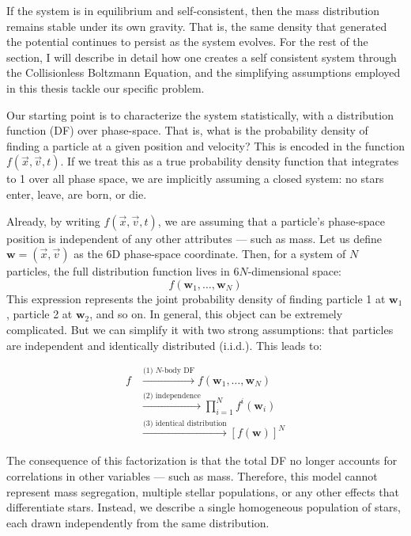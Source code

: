         If the system is in equilibrium and self-consistent, then the mass distribution remains stable under its own gravity. That is, the same density that generated the potential continues to persist as the system evolves. For the rest of the section, I will describe in detail how one creates a self consistent system through the Collisionless Boltzmann Equation, and the simplifying assumptions employed in this thesis tackle our specific problem.

        Our starting point is to characterize the system statistically, with a distribution function (DF) over phase-space. That is, what is the probability density of finding a particle at a given position and velocity? This is encoded in the function \( f(\vec{x}, \vec{v}, t) \). If we treat this as a true probability density function that integrates to 1 over all phase space, we are implicitly assuming a closed system: no stars enter, leave, are born, or die.

        Already, by writing \( f(\vec{x}, \vec{v}, t) \), we are assuming that a particle's phase-space position is independent of any other attributes — such as mass. Let us define \( \mathbf{w} = (\vec{x}, \vec{v}) \) as the 6D phase-space coordinate. Then, for a system of \( N \) particles, the full distribution function lives in \(6N\)-dimensional space:  
        \[
        f(\mathbf{w}_1, \dots, \mathbf{w}_N)
        \]  
        This expression represents the joint probability density of finding particle 1 at \( \mathbf{w}_1 \), particle 2 at \( \mathbf{w}_2 \), and so on. In general, this object can be extremely complicated. But we can simplify it with two strong assumptions: that particles are independent and identically distributed (i.i.d.). This leads to:

        \[
        \begin{array}{rl}
        f 
        & \stackrel{\text{(1) $N$-body DF}}{\longrightarrow} 
        f(\mathbf{w}_1, \dots, \mathbf{w}_N) \\[2ex]
        & \stackrel{\text{(2) independence}}{\longrightarrow} 
        \prod_{i=1}^N f^i(\mathbf{w}_i) \\[2ex]
        & \stackrel{\text{(3) identical distribution}}{\longrightarrow} 
        \left[ f(\mathbf{w}) \right]^N
        \end{array}
        \]

        The consequence of this factorization is that the total DF no longer accounts for correlations in other variables — such as mass. Therefore, this model cannot represent mass segregation, multiple stellar populations, or any other effects that differentiate stars. Instead, we describe a single homogeneous population of stars, each drawn independently from the same distribution.


